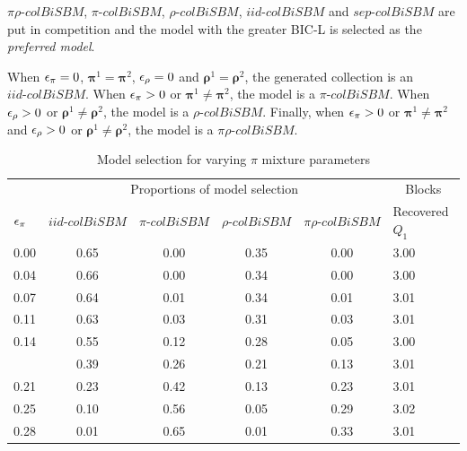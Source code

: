 \(\pi\rho\text{-}colBiSBM\), \(\pi\text{-}colBiSBM\),
\(\rho\text{-}colBiSBM\), \(iid\text{-}colBiSBM\) and
\(sep\text{-}colBiSBM\) are put in competition and the model with the
greater BIC-L is selected as the \emph{preferred model}.

When \(\eps[\pi] = 0\), \(\bm{\pi}^1 = \bm{\pi}^2\), \(\eps[\rho] = 0\)
and \(\bm{\rho}^1 = \bm{\rho}^2\), the generated collection is an
\(iid\text{-}colBiSBM\). When \(\eps[\pi] > 0\) or
\(\bm{\pi}^1 \neq \bm{\pi}^2\), the model is a \(\pi\text{-}colBiSBM\).
When \(\eps[\rho] > 0\) or \(\bm{\rho}^1 \neq \bm{\rho}^2\), the model
is a \(\rho\text{-}colBiSBM\). Finally, when \(\eps[\pi] > 0\) or
\(\bm{\pi}^1 \neq \bm{\pi}^2\) and \(\eps[\rho] > 0\) or
\(\bm{\rho}^1 \neq \bm{\rho}^2\), the model is a
\(\pi\rho\text{-}colBiSBM\).

\begin{table}[!h]

\caption{\label{tab:tables}\label{tab:pi-model-sel}Model selection for varying $\pi$ mixture parameters}
\centering
\begin{tabular}[t]{lccccl}
\toprule
\multicolumn{1}{c}{ } & \multicolumn{4}{c}{Proportions of model selection} & \multicolumn{1}{c}{Blocks} \\
\cmidrule(l{3pt}r{3pt}){2-5} \cmidrule(l{3pt}r{3pt}){6-6}
$\eps[\pi]$ & $iid\text{-}colBiSBM$     & $\pi\text{-}colBiSBM$ & $\rho\text{-}colBiSBM$ & $\pi\rho\text{-}colBiSBM$ & Recovered $Q_1$\\
\midrule
0.00 & 0.65 & 0.00 & 0.35 & 0.00 & 3.00\\
0.04 & 0.66 & 0.00 & 0.34 & 0.00 & 3.00\\
0.07 & 0.64 & 0.01 & 0.34 & 0.01 & 3.01\\
0.11 & 0.63 & 0.03 & 0.31 & 0.03 & 3.01\\
0.14 & 0.55 & 0.12 & 0.28 & 0.05 & 3.00\\
\addlinespace
0.18 & 0.39 & 0.26 & 0.21 & 0.13 & 3.01\\
0.21 & 0.23 & 0.42 & 0.13 & 0.23 & 3.01\\
0.25 & 0.10 & 0.56 & 0.05 & 0.29 & 3.02\\
0.28 & 0.01 & 0.65 & 0.01 & 0.33 & 3.01\\
\bottomrule
\end{tabular}
\end{table}

